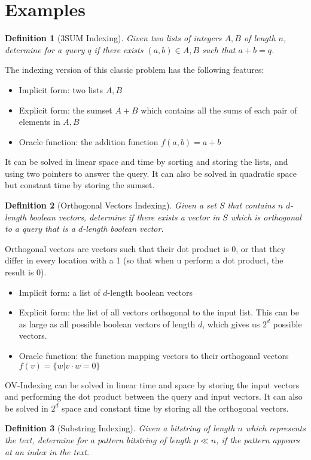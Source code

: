 \documentclass{article}
\newtheorem{definition}{Definition}
\begin{document}
\section{Examples}
\label{sec:examples}
\begin{definition}[3SUM Indexing]
Given two lists of integers $A,B$ of length $n$, determine for a query $q$ if there exists $(a,b) \in A,B$ such that $a+b=q$.
\end{definition}
The indexing version of this classic problem has the following features:
\begin{itemize}
    \item Implicit form: two lists $A,B$
    \item Explicit form: the sumset $A+B$ which contains all the sums of each pair of elements in $A,B$
    \item Oracle function: the addition function $f(a,b) = a+b$
\end{itemize}
It can be solved in linear space and time by sorting and storing the lists, and using two pointers to answer the query. It can also be solved in quadratic space but constant time by storing the sumset.
\begin{definition}[Orthogonal Vectors Indexing]
Given a set $S$ that contains $n$ $d$-length boolean vectors, determine if there exists a vector in $S$ which is orthogonal to a query that is a $d$-length boolean vector.
\end{definition}
Orthogonal vectors are vectors such that their dot product is 0, or that they differ in every location with a 1 (so that when u perform a dot product, the result is 0).
\begin{itemize}
    \item Implicit form: a list of $d$-length boolean vectors
    \item Explicit form: the list of all vectors orthogonal to the input list. This can be as large as all possible boolean vectors of length $d$, which gives us $2^d$ possible vectors.
    \item Oracle function: the function mapping vectors to their orthogonal vectors $f(v) = \{w | v \cdot w = 0\}$
\end{itemize}
OV-Indexing can be solved in linear time and space by storing the input vectors and performing the dot product between the query and input vectors. It can also be solved in $2^d$ space and constant time by storing all the orthogonal vectors.
\begin{definition}[Substring Indexing]
Given a bitstring of length $n$ which represents the text, determine for a pattern bitstring of length $p \ll n$, if the pattern appears at an index in the text.
\end{definition}
\end{document}
